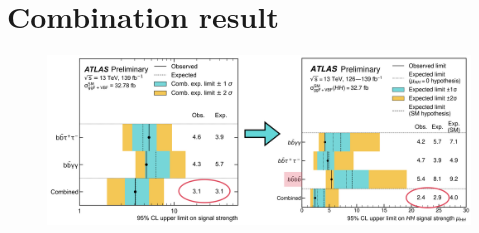 \section{Combination result}

\begin{figure}
    \centering
    \includegraphics[width=\textwidth]{figures/my_dihiggs/4b-nr-comb.png}
    \caption{\cite{ATLAS-CONF-2021-052} \cite{ATLAS-CONF-2022-050}}
    \label{fig:nr-sm-comb}
\end{figure}


